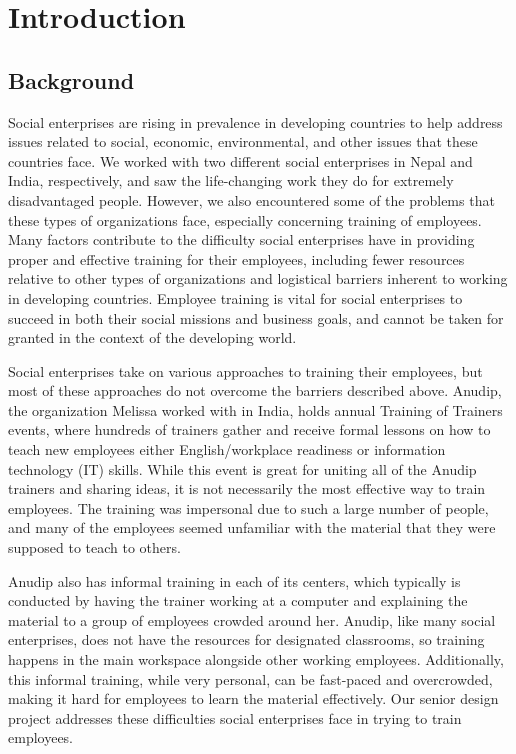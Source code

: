 \chapter{Introduction}

\section{Background}

Social enterprises are rising in prevalence in developing countries to help address issues related to social, economic, environmental, and other issues that these countries face. We worked with two different social enterprises in Nepal and India, respectively, and saw the life-changing work they do for extremely disadvantaged people. However, we also encountered some of the problems that these types of organizations face, especially concerning training of employees. Many factors contribute to the difficulty social enterprises have in providing proper and effective training for their employees, including fewer resources relative to other types of organizations and logistical barriers inherent to working in developing countries. Employee training is vital for social enterprises to succeed in both their social missions and business goals, and cannot be taken for granted in the context of the developing world.

Social enterprises take on various approaches to training their employees, but most of these approaches do not overcome the barriers described above. Anudip, the organization Melissa worked with in India, holds annual Training of Trainers events, where hundreds of trainers gather and receive formal lessons on how to teach new employees either English/workplace readiness or information technology (IT) skills. While this event is great for uniting all of the Anudip trainers and sharing ideas, it is not necessarily the most effective way to train employees. The training was impersonal due to such a large number of people, and many of the employees seemed unfamiliar with the material that they were supposed to teach to others. 

Anudip also has informal training in each of its centers, which typically is conducted by having the trainer working at a computer and explaining the material to a group of employees crowded around her. Anudip, like many social enterprises, does not have the resources for designated classrooms, so training happens in the main workspace alongside other working employees. Additionally, this informal training, while very personal, can be fast-paced and overcrowded, making it hard for employees to learn the material effectively. Our senior design project addresses these difficulties social enterprises face in trying to train employees.

